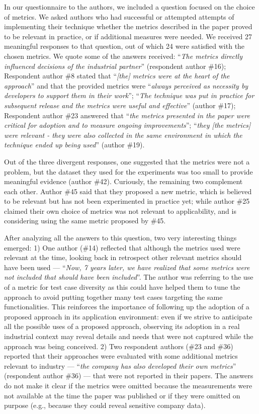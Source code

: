 %

In our questionnaire to the authors, we included a question focused on the choice of metrics.
We asked authors who had successful or attempted attempts of implementing their technique whether the metrics described in the paper proved to be relevant in practice, or if additional measures were needed.
%
We received 27 meaningful responses to that question, out of which 24 were satisfied with the chosen metrics.
We quote some of the answers received:
``\textit{The metrics directly influenced decisions of the industrial partner}'' (respondent author \#16);
%
Respondent author \#8 stated that 
``\textit{[the] metrics were at the heart of the approach}'' 
and that the provided metrics were 
``\textit{always perceived as necessity by developers to support them in their work}'';
%
 ``\textit{The technique was put in practice for subsequent release and the metrics were useful and effective}'' (author \#17);
%
Respondent author \#23 answered that ``\textit{the metrics presented in the paper were critical for adoption and to measure ongoing improvements}'';
``\textit{they [the metrics] were relevant - they were also collected in the same environment in which the technique ended up being used}'' (author \#19).

Out of the three divergent responses, one suggested that the metrics were not a problem, but the dataset they used for the experiments was too small to provide meaningful evidence (author \#42).
Curiously, the remaining two complement each other. 
Author \#45 said that they proposed a new metric, which is believed to be relevant but has not been experimented in practice yet; while author \#25 claimed their own choice of metrics was not relevant to applicability, and is considering using the same metric proposed by \#45.


After analyzing all the answers to this question, two very interesting things emerged:
1) One author (\#14) reflected that although the metrics used were relevant at the time, looking back in retrospect other relevant metrics should have been used --- 
``\textit{Now, 7 years later, we have realized that some metrics were not included that should have been included}''.
The author was referring to the use of a metric for test case diversity as this could have helped them to tune the approach to avoid putting together many test cases targeting the same functionalities.
This reinforces the importance of following up the adoption of a proposed approach in its application environment:
even if we strive to anticipate all the possible uses of a proposed approach, observing its adoption in a real industrial context may reveal details and needs that were not captured while the approach was being conceived.
2) Two respondent authors (\#23 and \#36) reported that their approaches were evaluated with some additional metrics relevant to industry --- ``\textit{the company has also developed their own metrics}'' (respondent author \#36) --- that were not reported in their papers.
The answers do not make it clear if the metrics were omitted because the measurements were not available at the time the paper was published or if they were omitted on purpose (e.g., because they could reveal sensitive company data).

